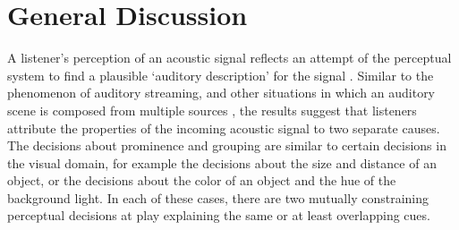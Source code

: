 \documentclass[man,natbib,floatsintext]{apa6}\usepackage[]{graphicx}\usepackage[]{color}
\begin{document}
\section{General Discussion}

A listener's perception  of an  acoustic signal reflects an attempt of the perceptual system to find a plausible `auditory description' for the signal \citep{bregm81}. 
Similar to the phenomenon of auditory streaming, and other situations in which  an  auditory scene is composed from multiple sources  \citep{bregm71,bregm77, bregm90}, the results suggest that listeners attribute the properties of the incoming acoustic signal to two separate causes. 
The decisions about prominence and grouping are similar to certain decisions in the visual domain, for example the decisions about the size and distance of an object, or the decisions about the color of an object and the hue of the background light. 
In each of these cases, there are two mutually constraining perceptual decisions at play explaining the same or at least overlapping cues. 



\end{document}
